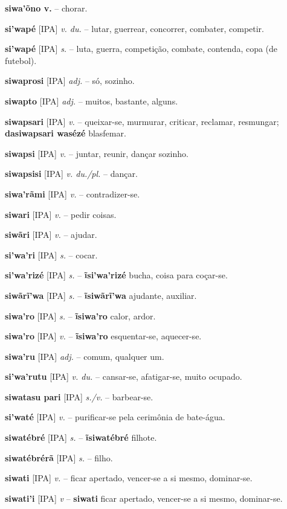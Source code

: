 \textbf{siwa'õno v.} -- chorar.

\textbf{si'wapé} [IPA] \textit{v. du.} -- lutar, guerrear, concorrer, combater, competir.

\textbf{si'wapé} [IPA] \textit{s.} -- luta, guerra, competição, combate, contenda, copa (de futebol).

\textbf{siwaprosi} [IPA] \textit{adj.} -- só, sozinho.

\textbf{siwapto} [IPA] \textit{adj.} -- muitos, bastante, alguns.

\textbf{siwapsari} [IPA] \textit{v.} -- queixar-se, murmurar, criticar, reclamar, resmungar; \textbf{dasiwapsari wasézé} blasfemar.

\textbf{siwapsi} [IPA] \textit{v.} -- juntar, reunir, dançar sozinho.

\textbf{siwapsisi} [IPA] \textit{v. du./pl.} -- dançar.

\textbf{siwa'rãmi} [IPA] \textit{v.} -- contradizer-se.

\textbf{siwari} [IPA] \textit{v.} -- pedir coisas.

\textbf{siwãri} [IPA] \textit{v.} -- ajudar.

\textbf{si'wa'ri} [IPA] \textit{s.} -- cocar.

\textbf{si'wa'rizé} [IPA] \textit{s.} -- \textbf{ĩsi'wa'rizé} bucha, coisa para coçar-se.

\textbf{siwãrĩ'wa} [IPA] \textit{s.} -- \textbf{ĩsiwãrĩ'wa} ajudante, auxiliar.

\textbf{siwa'ro} [IPA] \textit{s.} -- \textbf{ĩsiwa'ro} calor, ardor.

\textbf{siwa'ro} [IPA] \textit{v.} -- \textbf{ĩsiwa'ro} esquentar-se, aquecer-se.

\textbf{siwa'ru} [IPA] \textit{adj.} -- comum, qualquer um.

\textbf{si'wa'rutu} [IPA] \textit{v. du.} -- cansar-se, afatigar-se, muito ocupado.

\textbf{siwatasu pari} [IPA] \textit{s./v.} -- barbear-se.

\textbf{si'waté} [IPA] \textit{v.} -- purificar-se pela cerimônia de bate-água.

\textbf{siwatébré} [IPA] \textit{s.} -- \textbf{ĩsiwatébré} filhote.

\textbf{siwatébrérã} [IPA] \textit{s.} -- filho.

\textbf{siwati} [IPA] \textit{v.} -- ficar apertado, vencer-se a si mesmo, dominar-se.

\textbf{siwati'i} [IPA] \textit{v} -- \textbf{siwati} ficar apertado, vencer-se a si mesmo, dominar-se.


